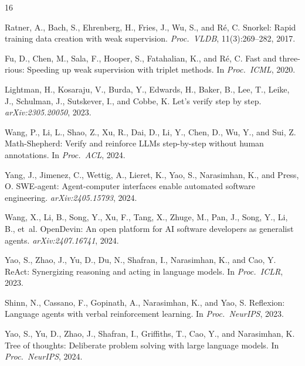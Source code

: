 \documentclass[11pt,a4paper]{article}
\begin{document}
\begin{thebibliography}{16}

Ratner, A., Bach, S., Ehrenberg, H., Fries, J., Wu, S., and R\'{e}, C.
\newblock Snorkel: Rapid training data creation with weak supervision.
\newblock \emph{Proc.\ VLDB}, 11(3):269--282, 2017.

Fu, D., Chen, M., Sala, F., Hooper, S., Fatahalian, K., and R\'{e}, C.
\newblock Fast and three-rious: Speeding up weak supervision with triplet methods.
\newblock In \emph{Proc.\ ICML}, 2020.

Lightman, H., Kosaraju, V., Burda, Y., Edwards, H., Baker, B., Lee, T., Leike, J., Schulman, J., Sutskever, I., and Cobbe, K.
\newblock Let's verify step by step.
\newblock \emph{arXiv:2305.20050}, 2023.

Wang, P., Li, L., Shao, Z., Xu, R., Dai, D., Li, Y., Chen, D., Wu, Y., and Sui, Z.
\newblock Math-Shepherd: Verify and reinforce LLMs step-by-step without human annotations.
\newblock In \emph{Proc.\ ACL}, 2024.

Yang, J., Jimenez, C., Wettig, A., Lieret, K., Yao, S., Narasimhan, K., and Press, O.
\newblock SWE-agent: Agent-computer interfaces enable automated software engineering.
\newblock \emph{arXiv:2405.15793}, 2024.

Wang, X., Li, B., Song, Y., Xu, F., Tang, X., Zhuge, M., Pan, J., Song, Y., Li, B., et~al.
\newblock OpenDevin: An open platform for AI software developers as generalist agents.
\newblock \emph{arXiv:2407.16741}, 2024.

Yao, S., Zhao, J., Yu, D., Du, N., Shafran, I., Narasimhan, K., and Cao, Y.
\newblock ReAct: Synergizing reasoning and acting in language models.
\newblock In \emph{Proc.\ ICLR}, 2023.

Shinn, N., Cassano, F., Gopinath, A., Narasimhan, K., and Yao, S.
\newblock Reflexion: Language agents with verbal reinforcement learning.
\newblock In \emph{Proc.\ NeurIPS}, 2023.

Yao, S., Yu, D., Zhao, J., Shafran, I., Griffiths, T., Cao, Y., and Narasimhan, K.
\newblock Tree of thoughts: Deliberate problem solving with large language models.
\newblock In \emph{Proc.\ NeurIPS}, 2024.


\end{thebibliography}
\end{document}
